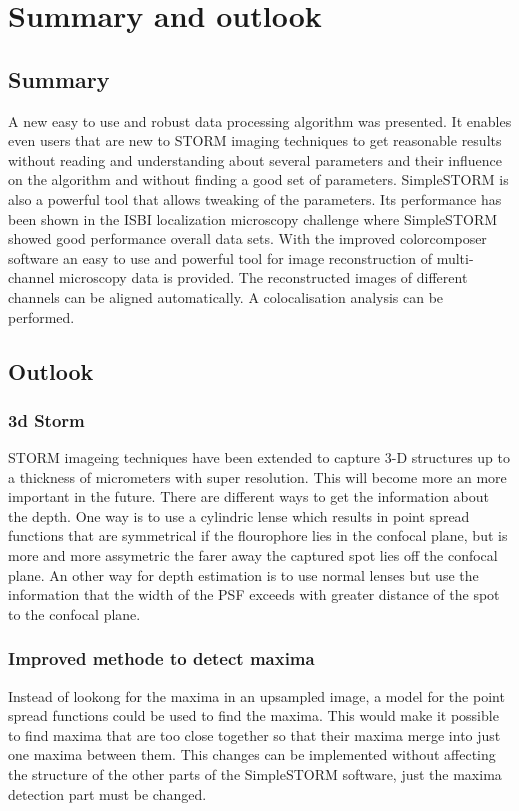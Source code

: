\chapter{Summary and outlook}
\section{Summary}
A new easy to use and robust data processing algorithm was presented. It enables even users that are new to STORM imaging techniques to get reasonable results without reading and understanding about several parameters and their influence on the algorithm and without finding a good set of parameters.\newline
SimpleSTORM is also a powerful tool that allows tweaking of the parameters. Its performance has been shown in the ISBI localization microscopy challenge where SimpleSTORM showed good performance overall data sets.\newline
With the improved colorcomposer software an easy to use and powerful tool for image reconstruction of multi-channel microscopy data is provided. The reconstructed images of different channels can be aligned automatically. A colocalisation analysis can be performed.
\section{Outlook}
\subsection{3d Storm}
STORM imageing techniques have been extended to capture 3-D structures up to a thickness of micrometers with super resolution. This will become more an more important in the future. There are different ways to get the information about the depth. One way is to use a cylindric lense which results in point spread functions that are symmetrical if the flourophore lies in the confocal plane, but is more and more assymetric the farer away the captured spot lies off the confocal plane.\newline
An other way for depth estimation is to use normal lenses but use the information that the width of the PSF exceeds with greater distance of the spot to the confocal plane.
\subsection{Improved methode to detect maxima}
Instead of lookong for the maxima in an upsampled image, a model for the point spread functions could be used to find the maxima. This would make it possible to find maxima that are too close together so that their maxima merge into just one maxima between them.\newline
This changes can be implemented without affecting the structure of the other parts of the SimpleSTORM software, just the maxima detection part must be changed.
